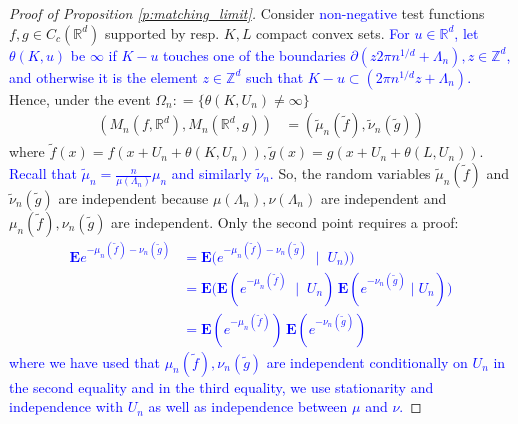 \documentclass[12pt]{article}
\newcommand{\R}{\mathbb{R}}
\newcommand{\1}{\mathbf{1}}
\newcommand{\REMOVE}[1]{}
\newcommand{\RL}[1]{\textcolor{blue}{#1}}
\newcommand{\dy}[1]{\textcolor{blue}{#1}}
\newcommand{\RL}[1]{#1}%
\newcommand{\dy}[1]{#1}%
\begin{document}
{{{{{\begin{proof}[Proof of Proposition \ref{p:matching_limit}]
Consider {\dy{non-negative} test functions $f,g \in C_c(\R^d)$} supported by resp. $ K,L$ compact convex sets. \RL{For $u \in \R^d$, let $\theta (K,u)$ be $ \infty $ if $ K-u $  touches one of the boundaries $\partial (z2\pi n^{ 1/d} + \Lambda _{ n}),z\in \mathbb{Z} ^{ d} $, and otherwise it is the element $ z\in \mathbb{Z} ^{ d}$ such that  $   K - u\subset (2\pi n^{ 1/d}z +  \Lambda _{ n})$.} Hence, under the event  $ \Omega_{n}: = \{\theta (K,U_{ n}) \neq  \infty \}$
%
%
\begin{align*}
(M_{n}(f,\mathbb{R}^{d}),M_{n}(\mathbb{R}^{d} ,g)) &= (\tilde \mu _{n}( \tilde f), \tilde \nu_{n}(\tilde g))
\end{align*}
%
where $ \tilde f(x) = f(x +  U_{ n} +  \theta (K,U_{ n})), \tilde g(x) = g(x + U_{ n} +  \theta (L,U_{ n}))$.
%
\dy{Recall that $\tilde \mu_n = \frac{n}{\mu(\Lambda_n)}\mu_n$ and similarly $\tilde \nu_n$.} {So, the random variables $\tilde \mu _{n}( \tilde f)$ and $\tilde \nu_{n}(\tilde g)$}  are independent because $\mu (\Lambda _{n}),\nu (\Lambda _{n})$ are independent and ${\mu_n}(\tilde f), {\nu_n}(\tilde g)$ are independent. Only the second point requires a proof:
 \dy{
%
\begin{align*}
\mathbf{E}e^{-\mu_n(\tilde f)-\nu_n(\tilde g)} &=  \mathbf{E}\bigl( e^{-\mu_n(\tilde f)-\nu_n(\tilde g)} \; \mid \;U_{n}) \bigr)\\
&=   {\mathbf{E}\bigl( \mathbf{E}( e^{-\mu_n(\tilde f)} \; \mid \; U_n) \, \mathbf{E}(e^{-\nu_n(\tilde g)} \;|\;U_{n}) \bigr)} \\
 & = \mathbf{E}(e^{-\mu_n(\tilde f)}) \, \mathbf{E}(e^{-\nu_n(\tilde g)})
\end{align*}
 where we have used that \dy{$\mu_n ( \tilde f),\nu_n ( \tilde g)$} are independent conditionally on $U_n$ in the second equality and in the third equality, we use stationarity and independence with $U_n$ as well as independence between $ \mu $ and $ \nu.$}
%
\REMOVE{for {Borel} sets $ I,J\subset \mathbb{R},$
\begin{align*}

\end{align*}}
\end{proof}}}}}}
\end{document}
